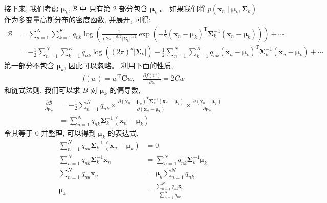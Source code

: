 \documentclass[UTF8]{ctexart}
\numberwithin{equation}{section}
\begin{document}
接下来, 我们考虑 $\boldsymbol{\mu}_{k}, \mathcal{B}$ 中
只有第 2 部分包含 $\boldsymbol{\mu}_{k}$ 。
如果我们将 $p\left(\boldsymbol{x}_{n} \mid \boldsymbol{\mu}_{k}, \boldsymbol{\Sigma}_{k}\right)$ 
作为多变量高斯分布的密度函数, 并展开, 可得:
$$
\begin{aligned}
\mathcal{B} &=\sum_{n=1}^{N} \sum_{k=1}^{K} q_{n k} \log \left(\frac{1}{(2 \pi)^{d / 2}\left|\boldsymbol{\Sigma}_{k}\right|^{1 / 2}} \exp \left(-\frac{1}{2}\left(\boldsymbol{x}_{n}-\boldsymbol{\mu}_{k}\right)^{\mathrm{T}} \boldsymbol{\Sigma}_{k}^{-1}\left(\boldsymbol{x}_{n}-\boldsymbol{\mu}_{k}\right)\right)\right)+\cdots \\
&=-\frac{1}{2} \sum_{n=1}^{N} \sum_{k=1}^{K} q_{n k} \log \left((2 \pi)^{d}\left|\boldsymbol{\Sigma}_{k}\right|\right)-\frac{1}{2} \sum_{n=1}^{N} \sum_{k=1}^{K} q_{n k}\left(\boldsymbol{x}_{n}-\boldsymbol{\mu}_{k}\right)^{\mathrm{T}} \boldsymbol{\Sigma}_{k}^{-1}\left(\boldsymbol{x}_{n}-\boldsymbol{\mu}_{k}\right)+\cdots
\end{aligned}
$$
第一部分不包含 $\boldsymbol{\mu}_{k}$, 因此可以忽略。
利用下面的性质,
$$
\begin{aligned}
f(w)=w^{\mathrm{T}} \boldsymbol{C} w, \quad \frac{\partial f(w)}{\partial w}=2 C w
\end{aligned}
$$
和链式法则, 我们可以求 $B$ 对 $\boldsymbol{\mu}_{k}$ 的偏导数,
$$
\begin{aligned}
\frac{\partial \mathcal{B}}{\partial \boldsymbol{\mu}_{k}} &=-\frac{1}{2} \sum_{n=1}^{N} q_{nk} \times \frac{\partial\left(\boldsymbol{x}_{n}-\boldsymbol{\mu}_{k}\right)^{\mathrm{T}} \boldsymbol{\Sigma}_{k}^{-1}\left(\boldsymbol{x}_{n}-\boldsymbol{\mu}_{k}\right)}{\partial\left(\boldsymbol{x}_{n}-\boldsymbol{\mu}_{k}\right)} \times \frac{\partial\left(\boldsymbol{x}_{n}-\boldsymbol{\mu}_{k}\right)}{\partial \boldsymbol{\mu}_{k}} \\
&=\sum_{n=1}^{N} q_{n k} \boldsymbol{\Sigma}_{k}^{-1}\left(\boldsymbol{x}_{n}-\boldsymbol{\mu}_{k}\right)
\end{aligned}
$$
令其等于 0 并整理, 可以得到 $\boldsymbol{\mu}_{k}$ 的表达式,
$$
\begin{aligned}
\sum_{n=1}^{N} q_{n k} \boldsymbol{\Sigma}_{k}^{-1}\left(\boldsymbol{x}_{n}-\boldsymbol{\mu}_{k}\right) &=0 \\
\sum_{n=1}^{N} q_{n k} \boldsymbol{\Sigma}_{k}^{-1} \boldsymbol{x}_{n} &=\sum_{n=1}^{N} q_{n k} \boldsymbol{\Sigma}_{k}^{-1} \boldsymbol{\mu}_{k} \\
\sum_{n=1}^{N} q_{n k} \boldsymbol{x}_{n} &=\boldsymbol{\mu}_{k} \sum_{n=1}^{N} q_{n k} \\
\boldsymbol{\mu}_{k} &=\frac{\sum_{n=1}^{N} q_{n k} \boldsymbol{x}_{n}}{\sum_{n=1}^{N} q_{n k}}
\end{aligned}
$$
\end{document}
